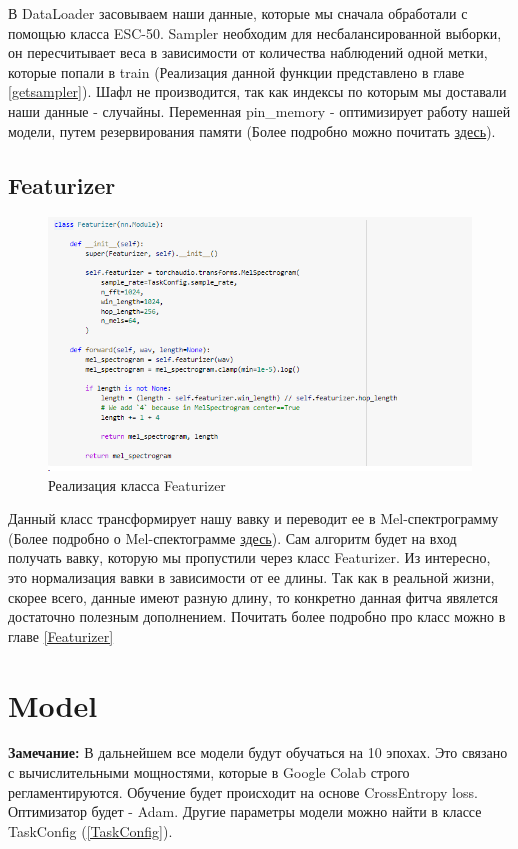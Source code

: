 \documentclass[a4paper,12pt]{article}
\begin{document}
 	В DataLoader засовываем наши данные, которые мы сначала обработали с помощью класса ESC-50. Sampler необходим для несбалансированной выборки, он пересчитывает веса в зависимости от количества наблюдений одной метки, которые попали в train (Реализация данной функции представлено в главе \ref{getsampler}).
 	Шафл не производится, так как индексы по которым мы доставали наши данные - случайны. Переменная pin\_memory - оптимизирует работу нашей модели, путем резервирования памяти (Более подробно можно почитать \href{https://medium.com/deelvin-machine-learning/pytorch-performance-tuning-in-action-7c4d065d4278}{здесь}).
	\subsection{Featurizer}
		\begin{figure}[H]
			\centering
			\includegraphics[width=0.7\linewidth]{Image/Featurizer}
			\caption{Реализация класса Featurizer}
			\label{fig:featurizer}
		\end{figure}
		Данный класс трансформирует нашу вавку и переводит ее в Mel-спектрограмму (Более подробно о Mel-спектограмме \href{https://medium.com/analytics-vidhya/understanding-the-mel-spectrogram-fca2afa2ce53}{здесь}). Сам алгоритм будет на вход получать вавку, которую мы пропустили через класс Featurizer. Из интересно, это нормализация вавки в зависимости от ее длины. Так как в реальной жизни, скорее всего, данные имеют разную длину, то конкретно данная фитча явялется достаточно полезным дополнением. Почитать более подробно про класс можно в главе \ref{Featurizer}
		
	
		 	
\section{Model}

\textbf{Замечание:} В дальнейшем все модели будут обучаться на 10 эпохах. Это связано с вычислительными мощностями, которые в Google Colab строго регламентируются. Обучение будет происходит на основе CrossEntropy loss. Оптимизатор будет - Adam. Другие параметры модели можно найти в классе TaskConfig (\ref{TaskConfig}).
\end{document}
